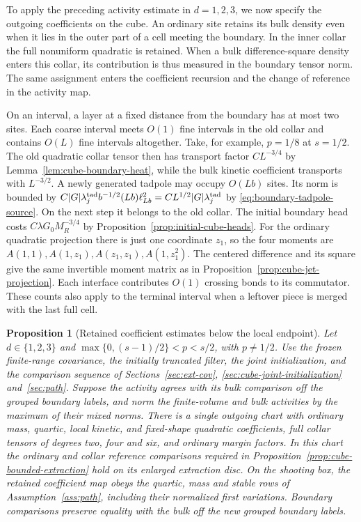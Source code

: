 \documentclass[11pt]{article}
\newtheorem{proposition}[theorem]{Proposition}
\theoremstyle{definition}
\begin{document}
To apply the preceding activity estimate in \(d=1,2,3\), we now specify
the outgoing coefficients on the cube. An ordinary site retains its
bulk density even when it lies in the outer part of a cell meeting
the boundary. In the inner collar the full nonuniform quadratic
is retained. When a bulk difference-square density enters this
collar, its contribution is thus measured in the boundary tensor
norm. The same assignment enters the coefficient recursion and
the change of reference in the activity map.

On an interval, a layer at a fixed distance from the boundary has at
most two sites. Each coarse interval meets \(O(1)\) fine intervals
in the old collar and contains \(O(L)\) fine intervals altogether.
Take, for example, \(p=1/8\) at \(s=1/2\). The old quadratic collar
tensor then has transport factor \(C L^{-3/4}\) by
Lemma~\ref{lem:cube-boundary-heat}, while the bulk kinetic
coefficient transports with \(L^{-3/2}\). A newly generated
tadpole may occupy \(O(Lb)\) sites. Its norm is bounded by
\(C|G|\lambda_j^{\rm tad}b^{-1/2}(Lb)\ell_{Lb}^2
=C L^{1/2}|G|\lambda_j^{\rm tad}\) by
\eqref{eq:boundary-tadpole-source}. On the next step it belongs to
the old collar. The initial boundary head costs
\(C\lambda G_0 M_R^{-3/4}\) by
Proposition~\ref{prop:initial-cube-heads}. For the ordinary quadratic
projection there is just one coordinate \(z_1\), so the four moments
are \(A(1,1),A(1,z_1),A(z_1,z_1),A(1,z_1^2)\).
The centered difference and its square give the same invertible
moment matrix as in Proposition~\ref{prop:cube-jet-projection}.
Each interface contributes \(O(1)\) crossing bonds to its commutator.
These counts also apply to the terminal interval when a leftover
piece is merged with the last full cell.

\begin{proposition}[Retained coefficient estimates below the local endpoint]
\label{prop:cube-retained-chart}
Let \(d\in\{1,2,3\}\) and \(\max\{0,(s-1)/2\}<p<s/2\),
with \(p\ne1/2\). Use the frozen finite-range
covariance, the initially truncated filter, the joint initialization,
and the comparison sequence of Sections~\ref{sec:ext-cov},
\ref{sec:cube-joint-initialization} and~\ref{sec:path}. Suppose
the activity agrees with its bulk comparison off the grouped boundary
labels, and norm the finite-volume and bulk activities by the maximum
of their mixed norms. There is a single outgoing chart with ordinary mass, quartic,
local kinetic, and fixed-shape quadratic coefficients, full collar
tensors of degrees two, four and six, and ordinary margin factors.
In this chart the ordinary and collar reference comparisons required
in Proposition~\ref{prop:cube-bounded-extraction} hold on its enlarged
extraction disc. On the shooting box, the retained coefficient map
obeys the quartic, mass and stable rows of
Assumption~\ref{ass:path}, including their normalized first
variations. Boundary comparisons preserve equality with the bulk off
the new grouped boundary labels.
\end{proposition}
\end{document}
